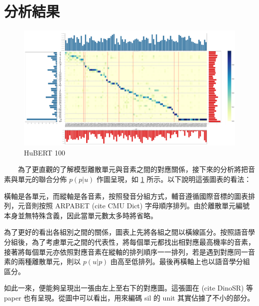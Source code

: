 \section{分析結果}

\begin{figure}
    \centering
    \includegraphics[width=1\linewidth]{figures/better__p_ph_given_un.png}
    \caption{HuBERT 100}
    \label{p_p_given_u-hub-100}
\end{figure}

　　為了更直觀的了解模型離散單元與音素之間的對應關係，接下來的分析將把音素與單元的聯合分佈 \(p(p|u)\) 作圖呈現，如 \ref{p_p_given_u-hub-100} 所示。以下說明這張圖表的看法：

        橫軸是各單元，而縱軸是各音素，按照發音分組方式，輔音遵循國際音標的圖表排列，元音則按照 ARPABET (cite CMU Dict) 字母順序排列。由於離散單元編號本身並無特殊含義，因此當單元數太多時將省略。

        為了更好的看出各組別之間的關係，圖表上先將各組之間以橫線區分。按照語音學分組後，為了考慮單元之間的代表性，將每個單元都找出相對應最高機率的音素，接著將每個單元亦依照對應音素在縱軸的排列順序一一排列，若是遇到對應同一音素的兩種離散單元，則以 \(p(u|p) \) 由高至低排列。最後再橫軸上也以語音學分組區分。

        如此一來，便能夠呈現出一張由左上至右下的對應圖。這張圖在 (cite DinoSR) 等 paper 也有呈現。從圖中可以看出，用來編碼 sil 的 unit 其實佔據了不小的部分。
